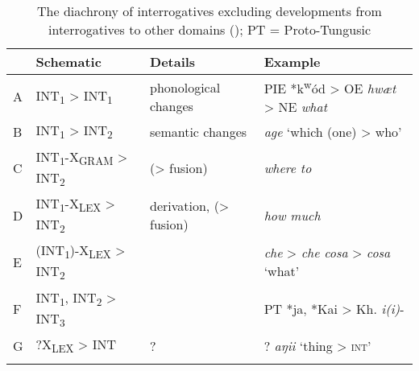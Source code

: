 \begin{table}
\caption{The diachrony of interrogatives excluding developments from interrogatives to other domains (\citealt{Hölzl2015c}); PT = Proto-Tungusic}
\label{tab:4:11}

\begin{tabularx}{\textwidth}{llQl}
\lsptoprule
& \textbf{Schematic} & \textbf{Details} & \textbf{Example}\\
\midrule
A & INT\textsubscript{1} > INT\textsubscript{1} & phonological changes & PIE *k\textsuperscript{w}ód > OE \textit{hwæt} > NE \textit{what}\\
B & INT\textsubscript{1} > INT\textsubscript{2} & semantic changes &  \textit{age} ‘which (one) > who’\\
C & INT\textsubscript{1}-X\textsubscript{GRAM} > INT\textsubscript{2} & \newline (> fusion) &  \textit{where to}\\
D & INT\textsubscript{1}-X\textsubscript{LEX} > INT\textsubscript{2} & derivation, \newline  (> fusion) &  \textit{how much}\\
E & (INT\textsubscript{1})-X\textsubscript{LEX} > INT\textsubscript{2} &  &  \textit{che} > \textit{che cosa }> \textit{cosa} ‘what’\\
F & INT\textsubscript{1}, INT\textsubscript{2} > INT\textsubscript{3} &  & PT *ja, *Kai > Kh.  \textit{i(i)}-\\
G & ?X\textsubscript{LEX} > INT & ? & ? \textit{aŋii} ‘thing > \textsc{int}’\\
\lspbottomrule
\end{tabularx}
\end{table}

